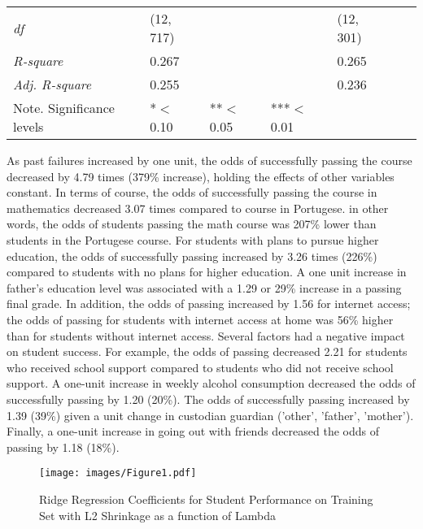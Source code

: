 \documentclass[sigconf]{acmart}
\begin{document}
\begin{table*}[ht]
\begin{tabular}{lllllll}
    \textit{df}         & (12, 717)          &       &        &         (12, 301)   &       &       \\
    \textit{R-square}   &      0.267         &       &        &         0.265       &       &       \\ 
    \textit{Adj. R-square} &   0.255         &       &        &         0.236       &       &       \\
    \bottomrule
    Note. Significance levels & *$<$0.10      & **$<$0.05  & ***$<$0.01 & & &
  \end{tabular}
\end{table*}



As past failures increased by one unit, the odds of successfully passing the 
course decreased by 4.79 times (379\% increase), holding the effects of other 
variables constant. In terms of course, the odds of successfully passing the 
course in mathematics decreased 3.07 times compared to course in Portugese. 
in other words, the odds of students passing the math course was 207\% lower 
than students in the Portugese course. For students with plans to pursue 
higher education, the odds of successfully passing increased by 3.26 times 
(226\%) compared to students with no plans for higher education. A one unit 
increase in father's education level was associated with a 1.29 or 29\% 
increase in a passing final grade. In addition, the odds of passing increased
by 1.56 for internet access; the odds of passing for students with internet 
access at home was 56\% higher than for students without internet access.  
Several factors had a negative impact on student success. For example, the 
odds of passing decreased 2.21 for students who received school support
compared to students who did not receive school support. A one-unit increase
in weekly alcohol consumption decreased the odds of successfully passing by 1.20 
(20\%). The odds of successfully passing increased by 1.39 (39\%) given a unit 
change in custodian guardian ('other', 'father', 'mother'). Finally, a one-unit 
increase in going out with friends decreased the odds of passing by 1.18 (18\%). 



\begin{figure}[!ht]
  \centering\texttt{[image: images/Figure1.pdf]}
  \caption{Ridge Regression Coefficients for Student Performance on Training Set
  with L2 Shrinkage as a function of Lambda}
  \label{f:Figure1}
\end{figure}
\end{document}
